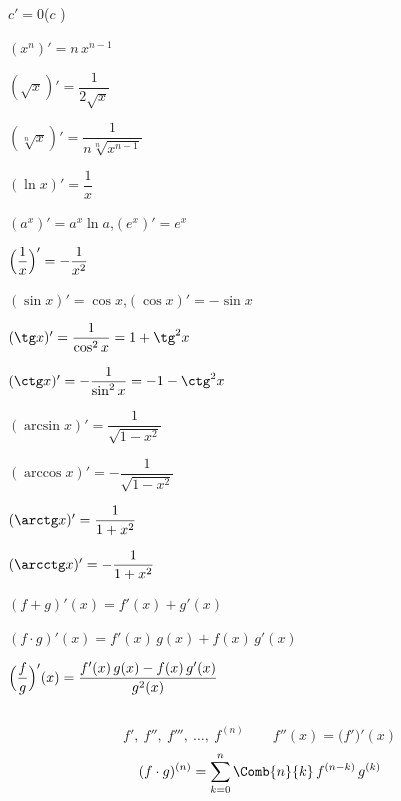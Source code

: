 \subsection{}
\begin{formulae}
\item $c'=0$\quad ($c$ )
\item $(x^n)'=n\,x^{n-1}$
\item $(\sqrt x)'=\dfrac1{2\sqrt x}$
\item $(\sqrt[n]{x})'=\dfrac1{n\sqrt[n]{x^{n-1}}}$
\item $(\ln x)'=\dfrac1x$
\item $(a^x)'=a^x\ln a$,\quad $(e^x)'=e^x$
\item $\Bigl(\dfrac1x\Bigr)'=-\dfrac1{x^2}$
\item $(\sin x)'=\cos x$,\quad $(\cos x)'=-\sin x$
\item $(\tg x)'=\dfrac1{\cos^2x}=1+\tg^2x$
\item $(\ctg x)'=-\dfrac1{\sin^2x}=-1-\ctg^2x$
\item $(\arcsin x)'=\dfrac1{\sqrt{1-x^2}}$
\item $(\arccos x)'=-\dfrac1{\sqrt{1-x^2}}$
\item $(\arctg x)'=\dfrac1{1+x^2}$
\item $(\arcctg x)'=-\dfrac1{1+x^2}$
\end{formulae}
\begin{description}[leftmargin=0pt,style=nextline]
\item[\tr{Suma}{Sum}{Summe}] $(f+g)'(x)=f'(x)+g'(x)$
\item[\tr{Produsul}{Product}{Produkt}] $(f\cdot g)'(x)=f'(x)\,g(x)+f(x)\,g'(x)$
\item[\tr{Câtul}{Quotient}{Quotient}] $\Bigl(\dfrac fg\Bigr)'(x)=\dfrac{f'(x)\,g(x)-f(x)\,g'(x)}{g^2(x)}$
\end{description}

\subsection{}
\[
f',\ f'',\ f''',\ \dots,\ f^{(n)}\qquad f''(x)=\bigl(f'\bigr)'(x)
\]
\textbf{} 
\[
(f\cdot g)^{(n)}=\sum_{k=0}^{n}\Comb{n}{k}\,f^{(n-k)}\,g^{(k)}
\]

